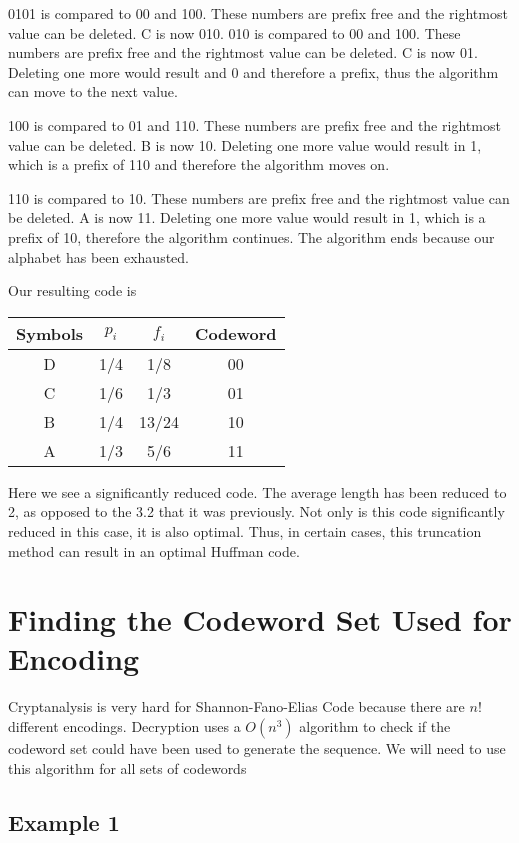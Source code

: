 \documentclass[10pt,letterpaper,notitlepage,draft]{article}
\theoremstyle{definition}
\begin{document}
0101 is compared to 00 and 100.
These numbers are prefix free and the rightmost value can be deleted.
C is now 010.
010 is compared to 00 and 100.
These numbers are prefix free and the rightmost value can be deleted.
C is now 01.
Deleting one more would result and 0 and therefore a prefix, thus the algorithm can move to the next value.

100 is compared to 01 and 110.
These numbers are prefix free and the rightmost value can be deleted.
B is now 10.
Deleting one more value would result in 1, which is a prefix of 110 and therefore the algorithm moves on.

110 is compared to 10.
These numbers are prefix free and the rightmost value can be deleted.
A is now 11.
Deleting one more value would result in 1, which is a prefix of 10, therefore the algorithm continues.
The algorithm ends because our alphabet has been exhausted.

Our resulting code is 
\begin{tabular}{|c|c|c|c|}
\hline
Symbols & $p_i$ & $f_i$ & Codeword \\
\hline
\hline
D & 1/4 & 1/8 & 00 \\
\hline
C & 1/6 & 1/3 & 01 \\
\hline
B & 1/4 & 13/24 & 10 \\
\hline
A & 1/3 & 5/6 & 11 \\
\hline
\end{tabular}


Here we see a significantly reduced code.  The average length has been reduced to 2, as opposed to the 3.2 that it was previously.  
Not only is this code significantly reduced in this case, it is also optimal.  
Thus, in certain cases, this truncation method can result in an optimal Huffman code.


\section{Finding the Codeword Set Used for Encoding}
Cryptanalysis is very hard for Shannon-Fano-Elias Code because there are $n!$ different encodings. 
Decryption uses a $O(n^3)$ algorithm to check if the codeword set could have been used to generate the sequence. 
We will need to use this algorithm for all sets of codewords

\subsection{Example 1}
\end{document}
